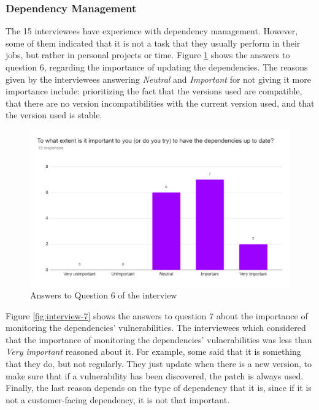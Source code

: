 \subsubsection{Dependency Management}

The 15 interviewees have experience with dependency management. However, some of them indicated that it is not a task that they usually perform in their jobs, but rather in personal projects or time. Figure \ref{fig:interview-6} shows the answers to question 6, regarding the importance of updating the dependencies. The reasons given by the interviewees answering \textit{Neutral} and \textit{Important} for not giving it more importance include: prioritizing the fact that the versions used are compatible, that there are no version incompatibilities with the current version used, and that the version used is stable.

\begin{figure}[ht!]
\begin{center}
\includegraphics[width=\textwidth]{figures/interview/Question6.png}
\caption{Answers to Question 6 of the interview}
\label{fig:interview-6}
\end{center}
\end{figure}

 Figure \ref{fig:interview-7} shows the answers to question 7 about the importance of monitoring the dependencies' vulnerabilities. The interviewees which considered that the importance of monitoring the dependencies' vulnerabilities was less than \textit{Very important} reasoned about it. For example, some said that it is something that they do, but not regularly. They just update when there is a new version, to make sure that if a vulnerability has been discovered, the patch is always used. Finally, the last reason depends on the type of dependency that it is, since if it is not a customer-facing dependency, it is not that important.

